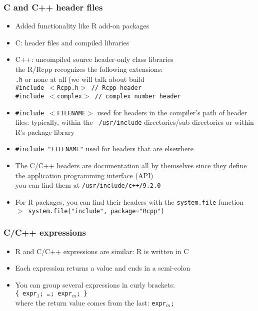 \documentclass[11pt,pdftex,dvipsnames,usenames,helvetica]{beamer}
\begin{document}
\begin{frame}[fragile]
\frametitle{C and C++ header files}

\begin{itemize}
\item Added functionality like R add-on packages
\item C: header files and compiled libraries
\item C++: uncompiled source header-only class libraries\\
the R/Rcpp recognizes the following extensions:\\
 {\tt .h} or none at all (we will talk about build\\
{\tt \#include $<$Rcpp.h$>$ // Rcpp header}\\ 
{\tt \#include $<$complex$>$ // complex number header}
\item {\tt \#include $<$FILENAME$>$} used for headers in the
  compiler's path of header files: typically, within the {\tt
    /usr/include} directories/sub-directories or within R's
package library
\item {\tt \#include "FILENAME"} used for headers that are elsewhere
\item The C/C++ headers are documentation all by themselves
since they define the application programming interface (API)\\
you can find them at {\tt /usr/include/c++/9.2.0}
\item For R packages, you can find their headers
 with the {\tt system.file} function\\
{\tt $>$ system.file("include", package="Rcpp")}
\end{itemize}

\end{frame}

\begin{frame}[fragile]
\frametitle{C/C++ expressions}

\begin{itemize}
\item R and C/C++ expressions are similar: R is written in C
\item Each expression returns a value and ends in a semi-colon
\item You can group several expressions in curly brackets:\\ 
{\tt \{ expr$_1$; \dots; expr$_m$; \}}\\
where the return value comes from the last: {\tt expr$_m$; }
\end{itemize}

\end{frame}
\end{document}
